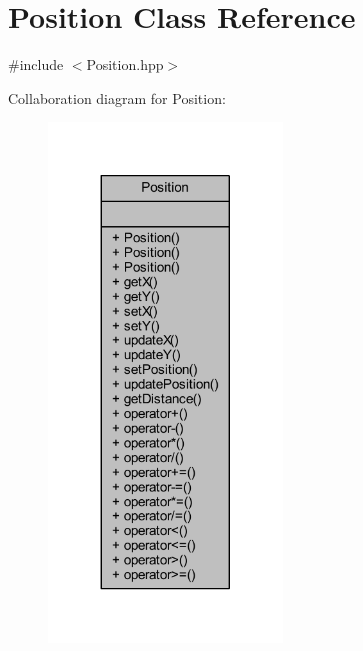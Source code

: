 \hypertarget{class_position}{}\section{Position Class Reference}
\label{class_position}


{\ttfamily \#include $<$Position.\+hpp$>$}



Collaboration diagram for Position\+:\nopagebreak
\begin{figure}[H]
\begin{center}
\leavevmode
\includegraphics[width=176pt]{class_position__coll__graph}
\end{center}
\end{figure}

